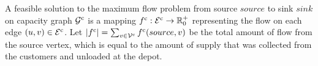 
A feasible solution to the maximum flow problem   from source
$source$
to sink
$sink$
on capacity graph
$ \mathcal G^{\rm c}$
is a mapping
$ f^{\rm c}: \mathcal E^{\rm c} \rightarrow \mathbb{R}^+_0$
representing the flow on each edge
$(u,v) \in \mathcal E^{\rm c}$.
Let
$|f^{\rm c}| = \sum_{v \in \mathcal V^{\rm c}} f^{\rm c}(source, v)$
be the total amount of flow from the source vertex, which is equal to the amount of supply that was collected from the customers and unloaded at the depot. \\


